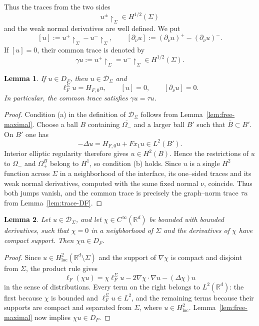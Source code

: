 \documentclass[a4paper,11pt]{article}
\numberwithin{equation}{section}
\newtheorem{lem}{Lemma}[section]
\theoremstyle{remark}
\theoremstyle{definition}
\theoremstyle{remark}
\begin{document}
Thus the traces from the two sides
$$
u^\pm\upharpoonright_\Sigma\in H^{1/2}(\Sigma)
$$
and the weak normal derivatives are well defined.
We put
$$
[u]:=u^+\upharpoonright_\Sigma-u^-\upharpoonright_\Sigma,
\qquad
[\partial_\nu u]:=(\partial_\nu u)^+-(\partial_\nu u)^-.
$$
If $[u]=0$, their common trace is denoted by
$$
\gamma u:=u^+\upharpoonright_\Sigma
=u^-\upharpoonright_\Sigma\in H^{1/2}(\Sigma).
$$

\begin{lem}\label{lem:free-in-transmission}
If $u\in D_F$, then $u\in\mathcal D_\Sigma$ and
$$
\ell_F^\Sigma u=H_{F,0}u,
\qquad
[u]=0,
\qquad
[\partial_\nu u]=0.
$$
In particular, the common trace satisfies $\gamma u=\tau u$.
\end{lem}

\begin{proof}
Condition (a) in the definition of $\mathcal D_\Sigma$ follows from Lemma~\ref{lem:free-maximal}.
Choose a ball $B$ containing $\overline{\Omega_-}$ and a larger ball $B'$ such that $\overline B\subset B'$.
On $B'$ one has
$$
-\Delta u=H_{F,0}u+Fx_1u\in L^2(B').
$$
Interior elliptic regularity therefore gives $u\in H^2(B)$.
Hence the restrictions of $u$ to $\Omega_-$ and $\Omega_+^B$ belong to $H^1$, so condition (b) holds.
Since $u$ is a single $H^2$ function across $\Sigma$ in a neighborhood of the interface, its one--sided traces and its weak normal derivatives, computed with the same fixed normal $\nu$, coincide.
Thus both jumps vanish, and the common trace is precisely the graph--norm trace $\tau u$ from Lemma~\ref{lem:trace-DF}.
\end{proof}

\begin{lem}\label{lem:cutoff-DF}
Let $u\in\mathcal D_\Sigma$, and let $\chi\in C^\infty(\mathbb R^d)$ be bounded with bounded derivatives, such that $\chi=0$ in a neighborhood of $\Sigma$ and the derivatives of $\chi$ have compact support.
Then $\chi u\in D_F$.
\end{lem}

\begin{proof}
Since $u\in H^2_{\mathrm{loc}}(\mathbb R^d\setminus\Sigma)$ and the support of $\nabla\chi$ is compact and disjoint from $\Sigma$, the product rule gives
$$
\ell_F(\chi u)
=
\chi\ell_F^\Sigma u
-2\nabla\chi\cdot\nabla u
-(\Delta\chi)u
$$
in the sense of distributions.
Every term on the right belongs to $L^2(\mathbb R^d)$: the first because $\chi$ is bounded and $\ell_F^\Sigma u\in L^2$, and the remaining terms because their supports are compact and separated from $\Sigma$, where $u\in H^2_{\mathrm{loc}}$.
Lemma~\ref{lem:free-maximal} now implies $\chi u\in D_F$.
\end{proof}
\end{document}
